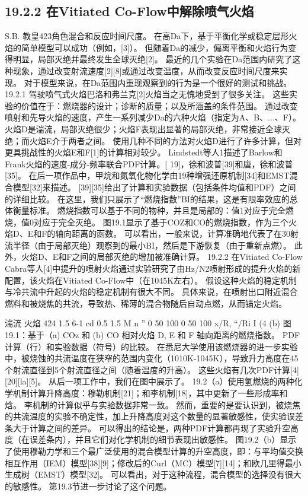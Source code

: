 \documentclass[UTF8,11pt,a4paper,openany,fontset=fandol]{ctexbook}
\begin{document}
\subsection{19.2.2 在Vitiated Co-Flow中解除喷气火焰}
S.B. 教皇423角色混合和反应时间尺度。 在高Da下，基于平衡化学或稳定层形火焰的简单模型可以成功（例如，[3]）。 但随着Da的减少，偏离平衡和火焰行为变得明显，局部灭绝并最终发生全球灭绝[2]。 最近的几个实验在Da范围内研究了这种现象，通过改变射流速度[2][8]或通过改变温度，从而改变反应时间尺度来实现。 对于模型来说，在Da范围内重现观察到的行为是一个很好的测试和挑战。 19.2.1 驾驶喷气式火焰巴洛和弗兰克[2]火焰当之无愧地受到了很多关注。 这些实验的价值在于：燃烧器的设计；诊断的质量；以及所涵盖的条件范围。 通过改变喷射和先导火焰的速度，产生一系列减少Da的六种火焰（指定为A、B、...、F）。 火焰D是湍流，局部灭绝很少；火焰F表现出显著的局部灭绝，非常接近全球灭绝；而火焰E介于两者之间。 使用几种不同的方法对火焰D进行了许多计算，但对更具挑战性的火焰E和F[1]的计算相对较少。 Lindstedt等人1描述了Barlow和Frank火焰的速度-成分-频率联合PDF计算。[ 19]，徐和波普[39]和唐，徐和波普[35]。 在后一项作品中，甲烷和氮氧化物化学由19种增强还原机制[34]和EMST混合模型[32]来描述。 [39][35]给出了计算和实验数据（包括条件均值和PDF）之间的详细比较。 在这里，我们只展示了“燃烧指数”BI的结果，这是有限率效应的总体衡量标准。 燃烧指数可以基于不同的物种，并且是局部的：值1对应于完全燃烧，值0对应于完全灭绝。 图19.1显示了基于COZ和CO的燃烧指数，作为三个火焰D、E和F的轴向距离的函数。 可以看出，一般来说，计算准确地代表了在30射流半径（由于局部灭绝）观察到的最小BI，然后是下游恢复（由于重新点燃）。 此外，火焰D、E和F之间的局部灭绝的增加被准确计算。 19.2.2 在Vitiated Co-Flow Cabra等人[4]中提升的喷射火焰通过实验研究了由Hz/N2喷射形成的提升火焰的新配置，该火焰在Vitiated Co-Flow中（在1045K左右）。 假设这种火焰的稳定机制与冷共流中升起的火焰的稳定机制有很大不同。 具体来说，在喷射出口附近混合燃料和被烧焦的共流，导致热、稀薄的混合物随后自动点燃，从而锚定火焰。

湍流 火焰 424 1.5 6-1 cd 0.5 1.5 M n ” 0 50 100 0 50 100 x/R, “/Ri I (4 (b) 图 19.1：基于（a) COz 和 (b) CO 相对火焰 D, E 和 F 轴向距离的燃烧指数。 PDF计算（行）和实验数据（符号）的比较。 在悉尼大学使用该燃烧器的进一步实验中，被烧蚀的共流温度在狭窄的范围内变化（1010K-1045K），导致升力高度在45个射流直径到5个射流直径之间（随着温度的升高）。 这些火焰有几次PDF计算[4][20][la][5]。 从后一项工作中，我们在图中展示了。 19.2（a）使用氢燃烧的两种化学机制计算升降高度：穆勒机制[21]；和李机制[18]，其中更新了一些形成率和焓。 李机制的计算似乎与实验数据非常一致。 然而，重要的是要认识到，被烧焦的共流温度的实验不确定性，加上升降高度对这个数量的显著敏感性，使实验误差条大于计算之间的差异。 可以得出的结论是，两种PDF计算都再现了实验升空高度（在误差条内），并且它们对化学机制的细节表现出敏感性。 图19.2（b）显示了使用穆勒力学和三个最广泛使用的混合模型计算的升空高度，即：与平均值交换相互作用（IEM）模型[38][9]；修改后的Curl（MC）模型[7][14]；和欧几里得最小生成树（EMST）模型[32]。 可以看出，对于这种流程，混合模型的选择没有很大的敏感性。 第19.3节进一步讨论了这个问题。
\end{document}

